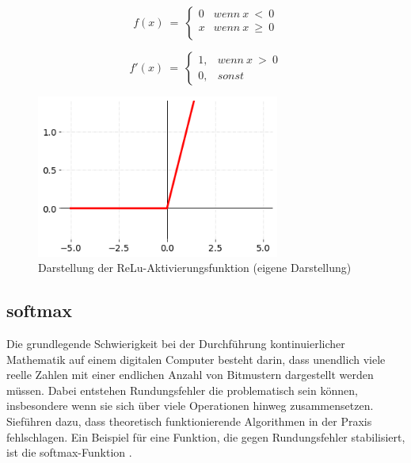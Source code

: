 \begin{equation} 
    f( x) \ =\ \begin{cases}
        0 & wenn\ x\  <\ 0    \\
        x & wenn\ x\  \geq\ 0 \\
    \end{cases}
\end{equation}
\label{Relu}

\begin{equation} 
    f'( x) \ =\ \begin{cases}
        1, & wenn\ x\  >\ 0 \\
        0, & sonst
    \end{cases}
\end{equation}
\label{ReluAbl}

\begin{figure}[H]
    \centering
    \includegraphics[width=8cm]{kapitel2/relu_plot.png}
    \caption[Darstellung der ReLu-Aktivierungsfunktion]{Darstellung der ReLu-Aktivierungsfunktion (eigene Darstellung)}
    \label{Kap2:ReLu_plot}
\end{figure}

\subsection{softmax}
Die grundlegende Schwierigkeit bei der Durchführung kontinuierlicher Mathematik auf einem digitalen Computer besteht darin, dass unendlich viele reelle Zahlen mit einer endlichen Anzahl von Bitmustern dargestellt werden müssen. Dabei entstehen Rundungsfehler die problematisch sein können, insbesondere wenn sie sich über viele Operationen hinweg zusammensetzen. Sieführen dazu, dass theoretisch funktionierende Algorithmen in der Praxis fehlschlagen. Ein Beispiel für eine Funktion, die gegen Rundungsfehler stabilisiert, ist die softmax-Funktion \cite*[80-81]{IanGoodfellowYoshuaBengio2016}.

